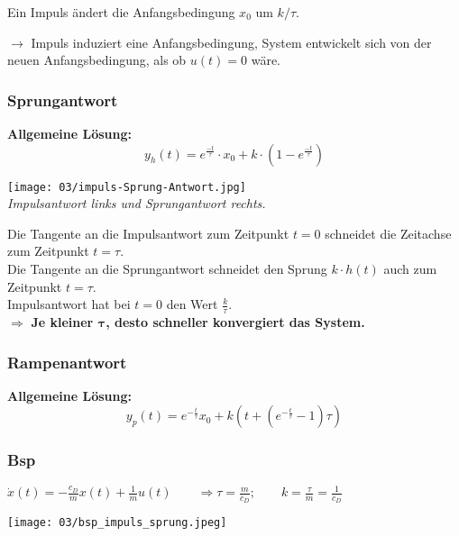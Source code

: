                 Ein Impuls ändert die Anfangsbedingung $x_0$ um $k / \tau $.
        
                $\rightarrow$ Impuls induziert eine Anfangsbedingung, System entwickelt sich von der neuen Anfangsbedingung, als ob $u(t) = 0$ wäre.
    
            \subsubsection{Sprungantwort}
                \textbf{Allgemeine Lösung:}
                \[y_h(t) = e^{\frac{-t}{\tau}}\cdot x_0 + k \cdot (1-e^{\frac{-t}{\tau}}) \]
                \begin{center}
                    \texttt{[image: 03/impuls-Sprung-Antwort.jpg]}\\
                    \textit{Impulsantwort links und Sprungantwort rechts.}
                \end{center}
                Die Tangente an die Impulsantwort zum Zeitpunkt $t=0$ schneidet die Zeitachse zum Zeitpunkt $t=\tau$. 
                \\Die Tangente an die Sprungantwort schneidet den Sprung $k\cdot h(t)$ auch zum Zeitpunkt $t=\tau$.
                \\Impulsantwort hat bei $t=0$ den Wert $\frac{k}{\tau}$.
                \\$\Rightarrow$ \textbf{Je kleiner $\mathbf{\tau}$, desto schneller konvergiert das System.}
            \subsubsection{Rampenantwort}
                \textbf{Allgemeine Lösung:}
                \[y_p(t)=e^{-\frac{t}{\tau}}x_0+k(t+(e^{-\frac{t}{\tau}}-1)\tau)\]
            \subsubsection{Bsp}
                $\dot{x}(t)=-\frac{c_D}{m}x(t)+\frac{1}{m}u(t)\qquad\Rightarrow \tau = \frac{m}{c_D};\qquad k=\frac{\tau}{m}=\frac{1}{c_D}$
                \begin{center}
                    \texttt{[image: 03/bsp\_impuls\_sprung.jpeg]}
                \end{center}
                
